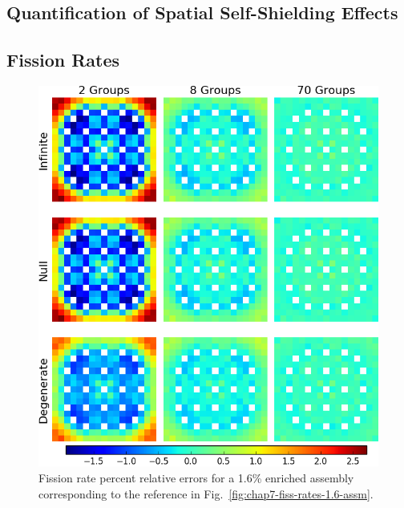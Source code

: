 \begin{appendices}
\chapter{Quantification of Spatial Self-Shielding Effects}
\label{app:quantify-mgxs-shielding}

\section{Fission Rates}
\label{sec:quantify-fiss-rates}

\begin{figure}[h!]
\centering
\includegraphics[width=\linewidth]{figures/quantification/appendix/assm-16/fiss-err}
\vspace{2mm}
\caption[Fission rate errors for a 1.6\% enriched assembly]{Fission rate percent relative errors for a 1.6\% enriched assembly corresponding to the reference in Fig.~\ref{fig:chap7-fiss-rates-1.6-assm}.}
\label{fig:quantify-assm-1.6-fiss-err}
\end{figure}

\clearpage


\end{appendices}
